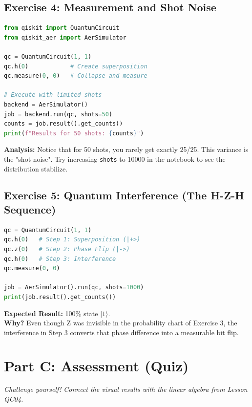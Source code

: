 \documentclass[a4paper,11pt]{article}
\begin{document}
\subsection{Exercise 4: Measurement and Shot Noise}
\begin{tcolorbox}[colback=green!5!white,colframe=green!75!black,title=Coding Task]
\begin{lstlisting}[language=Python]
from qiskit import QuantumCircuit
from qiskit_aer import AerSimulator

qc = QuantumCircuit(1, 1)
qc.h(0)            # Create superposition
qc.measure(0, 0)   # Collapse and measure

# Execute with limited shots
backend = AerSimulator()
job = backend.run(qc, shots=50)
counts = job.result().get_counts()
print(f"Results for 50 shots: {counts}")
\end{lstlisting}
\textbf{Analysis:} Notice that for 50 shots, you rarely get exactly 25/25. This variance is the "shot noise". Try increasing \texttt{shots} to 10000 in the notebook to see the distribution stabilize.
\end{tcolorbox}

\subsection{Exercise 5: Quantum Interference (The H-Z-H Sequence)}
\begin{tcolorbox}[colback=green!5!white,colframe=green!75!black,title=Coding Task]
\begin{lstlisting}[language=Python]
qc = QuantumCircuit(1, 1)
qc.h(0)   # Step 1: Superposition (|+>)
qc.z(0)   # Step 2: Phase Flip (|->)
qc.h(0)   # Step 3: Interference
qc.measure(0, 0)

job = AerSimulator().run(qc, shots=1000)
print(job.result().get_counts())
\end{lstlisting}
\textbf{Expected Result:} 100\% state $|1\rangle$.
\\
\textbf{Why?} Even though Z was invisible in the probability chart of Exercise 3, the interference in Step 3 converts that phase difference into a measurable bit flip.
\end{tcolorbox}

\section{Part C: Assessment (Quiz)}
\textit{Challenge yourself! Connect the visual results with the linear algebra from Lesson QC04.}
\end{document}
